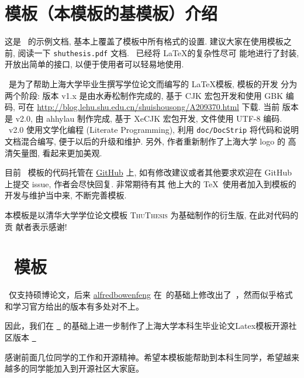 \label{cha:intro}

\section{\shuthesis 模板（本模板的基模板）介绍}
这是 \shuthesis\ 的示例文档, 基本上覆盖了模板中所有格式的设置. 建议大家在使用模板之
前, 阅读一下 \texttt{shuthesis.pdf} 文档. \shuthesis\ 已经将 \LaTeX 的复杂性尽可
能地进行了封装, 开放出简单的接口, 以便于使用者可以轻易地使用.

\shuthesis\ 是为了帮助上海大学毕业生撰写学位论文而编写的 \LaTeX 模板, 模板的开发
分为两个阶段: 版本 v1.x 是由水寿松制作完成的, 基于 CJK 宏包开发和使用 GBK 编码, 
可在 \url{http://blog.lehu.shu.edu.cn/shuishousong/A209370.html} 下载. 当前
版本是 v2.0, 由 ahhylau 制作完成, 基于 XeCJK 宏包开发, 文件使用 UTF-8 编码. 
\shuthesis\ v2.0 使用文学化编程 (Literate Programming), 利用 \texttt{doc/DocStrip} 
将代码和说明文档混合编写, 便于以后的升级和维护. 另外, 作者重新制作了上海大学 logo 的
高清矢量图, 看起来更加美观. 

目前 \shuthesis\ 模板的代码托管在 \href{https://github.com/ahhylau/shuthesis}{GitHub} 
上, 如有修改建议或者其他要求欢迎在 GitHub 上提交 issue, 作者会尽快回复. 非常期待有其
他上大的 \TeX\ 使用者加入到模板的开发与维护当中来, 不断完善模板.

本模板是以清华大学学位论文模板 \textsc{ThuThesis} 为基础制作的衍生版, 在此对代码的贡
献者表示感谢!

\section{\shubachelorthesisOSC\ 模板}
\shuthesis\ 仅支持硕博论文，后来 \href{https://github.com/alfredbowenfeng}{alfredbowenfeng}
在\shuthesis\ 的基础上修改出了\shubachelorthesis\ ，然而似乎格式和学习官方给出的版本有多处对不上。

因此，我们在 \href{https://github.com/alfredbowenfeng/SHU-Bachelor-Thesis}{\shubachelorthesis\ } 
的基础上进一步制作了上海大学本科生毕业论文Latex模板开源社区版本
\href{https://github.com/EnJiang/SHU-Bachelor-Thesis-OSC}{\shubachelorthesisOSC\ }


感谢前面几位同学的工作和开源精神。希望本模板能帮助到本科生同学，希望越来越多的同学能加入到开源社区大家庭。

